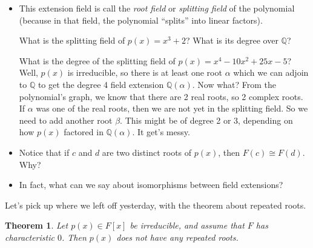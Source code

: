 \documentclass[12pt]{article}
\theoremstyle{plain}
\newtheorem*{theorem}{Theorem}
\theoremstyle{definition}
\theoremstyle{remark}
\newcommand{\ex}{\noindent{\bf Ex: }}
\def\Q{\mathbb Q}
\newcommand{\todayis}[1]{\clearpage{\rhead{\footnotesize #1}}}
\begin{document}
\begin{itemize}
\item This extension field is call the {\em root field} or {\em splitting field} of the polynomial (because in that field, the polynomial ``splits'' into linear factors).

\ex What is the splitting field of $p(x) = x^3 + 2$?  What is its degree over $\Q$?

\ex What is the degree of the splitting field of $p(x) = x^4 - 10x^2 + 25x - 5$?  Well, $p(x)$ is irreducible, so there is at least one root $\alpha$ which we can adjoin to $\Q$ to get the degree 4 field extension $\Q(\alpha)$.  Now what?  From the polynomial's graph, we know that there are 2 real roots, so 2 complex roots.  If $\alpha$ was one of the real roots, then we are not yet in the splitting field.  So we need to add another root $\beta$.  This might be of degree 2 or 3, depending on how $p(x)$ factored in $\Q(\alpha)$.  It get's messy.

\item Notice that if $c$ and $d$ are two distinct roots of $p(x)$, then $F(c) \cong F(d)$.  Why?

\item In fact, what can we say about isomorphisms between field extensions?  

\end{itemize}



\todayis{Wednesday, February 6}
Let's pick up where we left off yesterday, with the theorem about repeated roots.

  \begin{theorem}
  Let $p(x) \in F[x]$ be irreducible, and assume that $F$ has characteristic $0$.  Then $p(x)$ does not have any repeated roots.
  \end{theorem}
\end{document}
